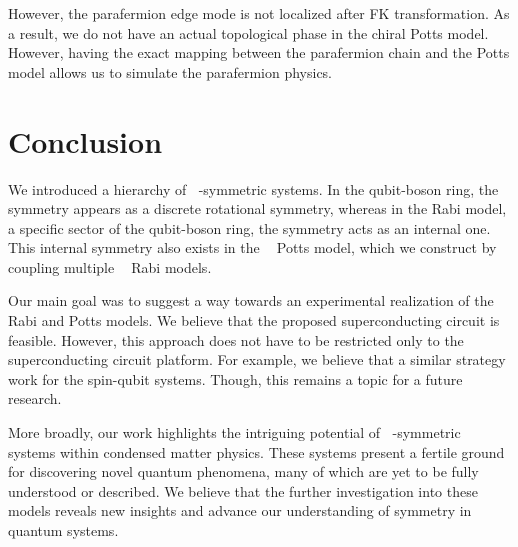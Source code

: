 \documentclass[reprint, aps, prx, amsmath, amssymb, longbibliography, superscriptaddress]{revtex4-2}
\DeclareMathOperator{\Zn}{\mathbb{Z}_n}
\DeclareMathOperator{\Zthree}{\mathbb{Z}_3}
\begin{document}
However, the parafermion edge mode is not localized after FK transformation. As a result, we do not have an actual topological phase in the chiral Potts model. However, having the exact mapping between the parafermion chain and the Potts model allows us to simulate the parafermion physics.



\section{Conclusion}
\label{sec:conclusion}

We introduced a hierarchy of $\Zthree$-symmetric systems. In the qubit-boson ring, the $\Zthree$ symmetry appears as a discrete rotational symmetry, whereas in the Rabi model, a specific sector of the qubit-boson ring, the symmetry acts as an internal one. This internal symmetry also exists in the $\Zthree$ Potts model, which we construct by coupling multiple $\Zthree$ Rabi models.

Our main goal was to suggest a way towards an experimental realization of the $\Zthree$ Rabi and Potts models. We believe that the proposed superconducting circuit is feasible. However, this approach does not have to be restricted only to the superconducting circuit platform. For example, we believe that a similar strategy work for the spin-qubit systems. Though, this remains a topic for a future research.

More broadly, our work highlights the intriguing potential of $\Zn$-symmetric systems within condensed matter physics. These systems present a fertile ground for discovering novel quantum phenomena, many of which are yet to be fully understood or described. We believe that the further investigation into these models reveals new insights and advance our understanding of symmetry in quantum systems.

\end{document}
